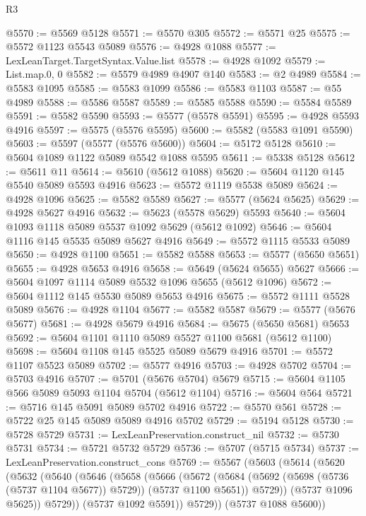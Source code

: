 \begin{lexlean}{R3}
\begin{coremodule}
@5570 := @5569 @5128
@5571 := @5570 @305
@5572 := @5571 @25
@5575 := @5572 @1123 @5543 @5089
@5576 := @4928 @1088
@5577 := LexLeanTarget.TargetSyntax.Value.list
@5578 := @4928 @1092
@5579 := List.map.{0, 0}
@5582 := @5579 @4989 @4907 @140
@5583 := @2 @4989
@5584 := @5583 @1095
@5585 := @5583 @1099
@5586 := @5583 @1103
@5587 := @55 @4989
@5588 := @5586 @5587
@5589 := @5585 @5588
@5590 := @5584 @5589
@5591 := @5582 @5590
@5593 := @5577 (@5578 @5591)
@5595 := @4928 @5593 @4916
@5597 := @5575 (@5576 @5595)
@5600 := @5582 (@5583 @1091 @5590)
@5603 := @5597 (@5577 (@5576 @5600))
@5604 := @5172 @5128
@5610 := @5604 @1089 @1122 @5089 @5542 @1088 @5595
@5611 := @5338 @5128
@5612 := @5611 @11
@5614 := @5610 (@5612 @1088)
@5620 := @5604 @1120 @145 @5540 @5089 @5593 @4916
@5623 := @5572 @1119 @5538 @5089
@5624 := @4928 @1096
@5625 := @5582 @5589
@5627 := @5577 (@5624 @5625)
@5629 := @4928 @5627 @4916
@5632 := @5623 (@5578 @5629) @5593
@5640 := @5604 @1093 @1118 @5089 @5537 @1092 @5629 (@5612 @1092)
@5646 := @5604 @1116 @145 @5535 @5089 @5627 @4916
@5649 := @5572 @1115 @5533 @5089
@5650 := @4928 @1100
@5651 := @5582 @5588
@5653 := @5577 (@5650 @5651)
@5655 := @4928 @5653 @4916
@5658 := @5649 (@5624 @5655) @5627
@5666 := @5604 @1097 @1114 @5089 @5532 @1096 @5655 (@5612 @1096)
@5672 := @5604 @1112 @145 @5530 @5089 @5653 @4916
@5675 := @5572 @1111 @5528 @5089
@5676 := @4928 @1104
@5677 := @5582 @5587
@5679 := @5577 (@5676 @5677)
@5681 := @4928 @5679 @4916
@5684 := @5675 (@5650 @5681) @5653
@5692 := @5604 @1101 @1110 @5089 @5527 @1100 @5681 (@5612 @1100)
@5698 := @5604 @1108 @145 @5525 @5089 @5679 @4916
@5701 := @5572 @1107 @5523 @5089
@5702 := @5577 @4916
@5703 := @4928 @5702
@5704 := @5703 @4916
@5707 := @5701 (@5676 @5704) @5679
@5715 := @5604 @1105 @566 @5089 @5093 @1104 @5704 (@5612 @1104)
@5716 := @5604 @564
@5721 := @5716 @145 @5091 @5089 @5702 @4916
@5722 := @5570 @561
@5728 := @5722 @25 @145 @5089 @5089 @4916 @5702
@5729 := @5194 @5128
@5730 := @5728 @5729
@5731 := LexLeanPreservation.construct_nil
@5732 := @5730 @5731
@5734 := @5721 @5732 @5729
@5736 := @5707 (@5715 @5734)
@5737 := LexLeanPreservation.construct_cons
@5769 := @5567
    (@5603
      (@5614
        (@5620
          (@5632
            (@5640
              (@5646
                (@5658
                  (@5666
                    (@5672
                      (@5684 (@5692 (@5698 (@5736 (@5737 @1104 @5677)) @5729)) (@5737 @1100 @5651))
                      @5729))
                  (@5737 @1096 @5625))
                @5729))
            (@5737 @1092 @5591))
          @5729))
      (@5737 @1088 @5600))

\end{coremodule}
\end{lexlean}
